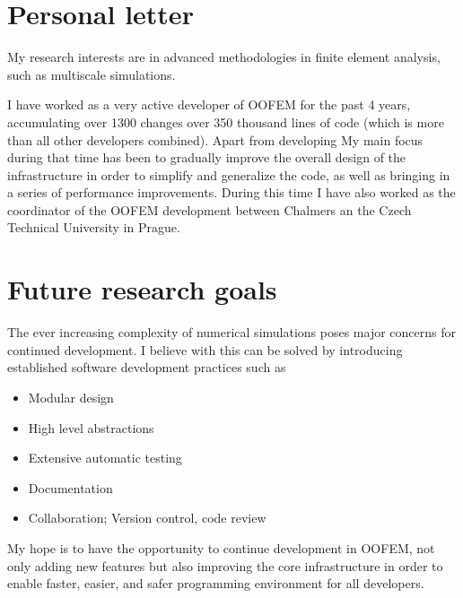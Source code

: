 \documentclass{article}
\begin{document}
\section{Personal letter}
My research interests are in advanced methodologies in finite element analysis, such as multiscale simulations.

I have worked as a very active developer of OOFEM for the past 4 years, accumulating over 1300 changes over 350 thousand lines of code (which is more than all other developers combined).
Apart from developing 
My main focus during that time has been to gradually improve the overall design of the infrastructure in order to simplify and generalize the code, as well as bringing in a series of performance improvements.
During this time I have also worked as the coordinator of the OOFEM development between Chalmers an the Czech Technical University in Prague.


\section{Future research goals}
The ever increasing complexity of numerical simulations poses major concerns for continued development.
I believe with this can be solved by introducing established software development practices such as
\begin{itemize}
 \item Modular design
 \item High level abstractions
 \item Extensive automatic testing
 \item Documentation
 \item Collaboration; Version control, code review
\end{itemize}
My hope is to have the opportunity to continue development in OOFEM, not only adding new features but also improving the core infrastructure in order to enable faster, easier, and safer programming environment for all developers.
\end{document}

